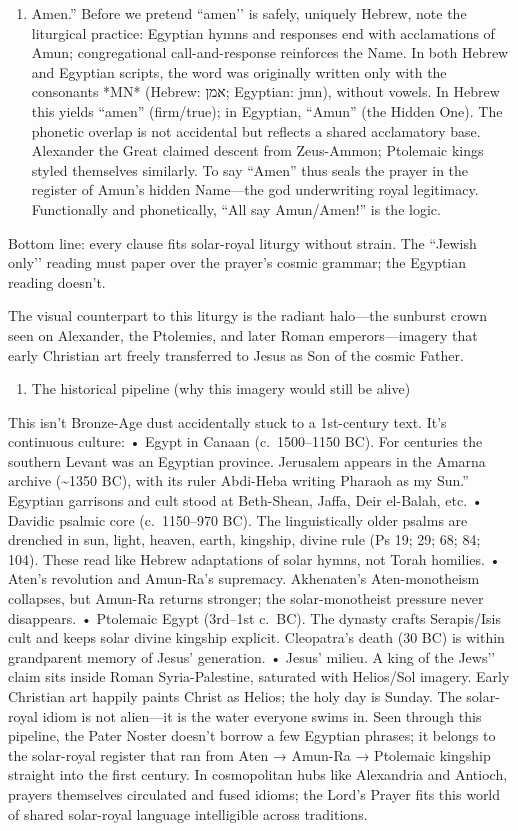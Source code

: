 \begin{enumerate}
\item
Amen.'' Before we pretend ``amen’’ is safely, uniquely Hebrew, note the liturgical practice: Egyptian hymns and responses end with acclamations of Amun; congregational call-and-response reinforces the Name. In both Hebrew and Egyptian scripts, the word was originally written only with the consonants *MN* (Hebrew: אמן; Egyptian: jmn), without vowels. In Hebrew this yields “amen” (firm/true); in Egyptian, “Amun” (the Hidden One). The phonetic overlap is not accidental but reflects a shared acclamatory base. Alexander the Great claimed descent from Zeus-Ammon; Ptolemaic kings styled themselves similarly. To say “Amen” thus seals the prayer in the register of Amun’s hidden Name—the god underwriting royal legitimacy. Functionally and phonetically, “All say Amun/Amen!” is the logic.
\end{enumerate}

Bottom line: every clause fits solar-royal liturgy without strain.
The ``Jewish only’’ reading must paper over the prayer’s cosmic grammar; the Egyptian reading doesn’t.

The visual counterpart to this liturgy is the radiant halo—the sunburst crown seen on Alexander, the Ptolemies, and later Roman emperors—imagery that early Christian art freely transferred to Jesus as Son of the cosmic Father.
\begin{enumerate}
\def\labelenumi{\arabic{enumi})}
\setcounter{enumi}{3}
\item
The historical pipeline (why this imagery would still be alive)
\end{enumerate}
This isn’t Bronze-Age dust accidentally stuck to a 1st-century text.
It’s continuous culture: • Egypt in Canaan (c.~1500–1150 BC).
For centuries the southern Levant was an Egyptian province.
Jerusalem appears in the Amarna archive (\textasciitilde1350 BC), with its ruler Abdi-Heba writing Pharaoh as my Sun.'' Egyptian garrisons and cult stood at Beth-Shean, Jaffa, Deir el-Balah, etc. • Davidic psalmic core (c.~1150--970 BC). The linguistically older psalms are drenched in sun, light, heaven, earth, kingship, divine rule (Ps 19; 29; 68; 84; 104). These read like Hebrew adaptations of solar hymns, not Torah homilies. • Aten's revolution and Amun-Ra's supremacy. Akhenaten's Aten-monotheism collapses, but Amun-Ra returns stronger; the solar-monotheist pressure never disappears. • Ptolemaic Egypt (3rd--1st c.~BC). The dynasty crafts Serapis/Isis cult and keeps solar divine kingship explicit. Cleopatra's death (30 BC) is within grandparent memory of Jesus' generation. • Jesus' milieu. A king of the Jews’’ claim sits inside Roman Syria-Palestine, saturated with Helios/Sol imagery.
Early Christian art happily paints Christ as Helios; the holy day is Sunday.
The solar-royal idiom is not alien—it is the water everyone swims in.
Seen through this pipeline, the Pater Noster doesn’t borrow a few Egyptian phrases; it belongs to the solar-royal register that ran from Aten → Amun-Ra → Ptolemaic kingship straight into the first century. In cosmopolitan hubs like Alexandria and Antioch, prayers themselves circulated and fused idioms; the Lord’s Prayer fits this world of shared solar-royal language intelligible across traditions.

